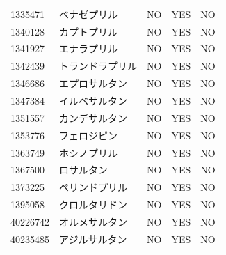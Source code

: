 \documentclass[
  11pt]{book}
\theoremstyle{definition}
\theoremstyle{definition}
\theoremstyle{definition}
\theoremstyle{definition}
\theoremstyle{remark}
\begin{document}
\begin{longtable}[]{@{}lllll@{}}
1335471 & ベナゼプリル & NO & YES & NO \\
1340128 & カプトプリル & NO & YES & NO \\
1341927 & エナラプリル & NO & YES & NO \\
1342439 & トランドラプリル & NO & YES & NO \\
1346686 & エプロサルタン & NO & YES & NO \\
1347384 & イルベサルタン & NO & YES & NO \\
1351557 & カンデサルタン & NO & YES & NO \\
1353776 & フェロジピン & NO & YES & NO \\
1363749 & ホシノプリル & NO & YES & NO \\
1367500 & ロサルタン & NO & YES & NO \\
1373225 & ペリンドプリル & NO & YES & NO \\
1395058 & クロルタリドン & NO & YES & NO \\
40226742 & オルメサルタン & NO & YES & NO \\
40235485 & アジルサルタン & NO & YES & NO \\
\end{longtable}
\end{document}
